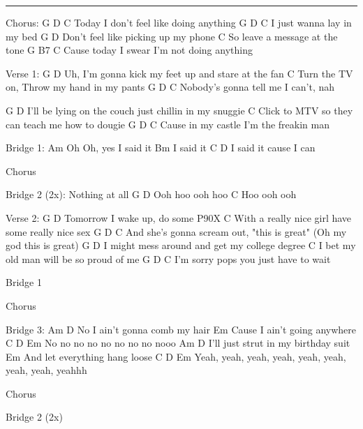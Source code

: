 \noindent\rule{\columnwidth}{1pt}

\begin{lstsong}
Chorus:
G                  D         C
Today I don't feel like doing anything
G            D        C
I just wanna lay in my bed
G                       D
Don't feel like picking up my phone
C
So leave a message at the tone
G                       B7       C
Cause today I swear I'm not doing anything

Verse 1:
    G                             D
Uh, I'm gonna kick my feet up and stare at the fan
C
Turn the TV on, Throw my hand in my pants
G              D        C
Nobody's gonna tell me I can't, nah

G                               D
I'll be lying on the couch just chillin in my snuggie
C
Click to MTV so they can teach me how to dougie
G                  D              C
Cause in my castle I'm the freakin man

Bridge 1:
       Am
Oh Oh, yes I said it
Bm
I said it
C                 D
I said it cause I can

Chorus

Bridge 2 (2x):
Nothing at all
G       D
Ooh hoo ooh hoo
C
Hoo ooh ooh

Verse 2:
G                           D
Tomorrow I wake up, do some P90X
C
With a really nice girl have some really nice sex
G                      D              C
And she's gonna scream out, "this is great" (Oh my god this is great)
G                              D
I might mess around and get my college degree
C
I bet my old man will be so proud of me
G                  D           C
I'm sorry pops you just have to wait

Bridge 1

Chorus

Bridge 3:
     Am                 D
No I ain't gonna comb my hair
        Em              
Cause I ain't going anywhere
C           D          Em
No no no no no no no no nooo
          Am                  D
I'll just strut in my birthday suit
    Em                   
And let everything hang loose
C                       D                        Em
Yeah, yeah, yeah, yeah, yeah, yeah, yeah, yeah, yeahhh

Chorus

Bridge 2 (2x)
\end{lstsong}
\newpage

